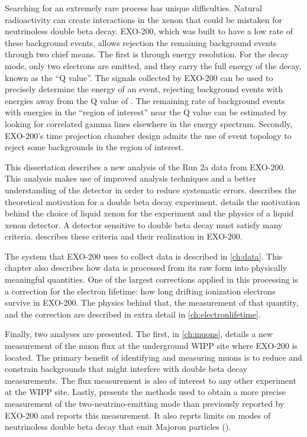 \documentclass[herrin-thesis.tex]{subfiles}
\begin{document}
Searching for an extremely rare process has unique difficulties. Natural radioactivity can create interactions in the xenon that could be mistaken for neutrinoless double beta decay. EXO-200, which was built to have a low rate of these background events, allows rejection the remaining background events through two chief means. The first is through energy resolution. For the \zeronu{} decay mode, only two electrons are emitted, and they carry the full energy of the decay, known as the ``Q value''. The signals collected by EXO-200 can be used to precisely determine the energy of an event, rejecting background events with energies away from the Q value of . The remaining rate of background events with energies in the ``region of interest'' near the Q value can be estimated by looking for correlated gamma lines elsewhere in the energy spectrum. Secondly, EXO-200's time projection chamber design admits the use of event topology to reject some backgrounds in the region of interest.

This dissertation describes a new analysis of the Run 2a data from EXO-200. This analysis makes use of improved analysis techniques and a better understanding of the detector in order to reduce systematic errors.  describes the theoretical motivation for a double beta decay experiment.  details the motivation behind the choice of liquid xenon for the experiment and the physics of a liquid xenon detector. A detector sensitive to double beta decay must satisfy many criteria.  describes these criteria and their realization in EXO-200.

The system that EXO-200 uses to collect data is described in \cref{ch:data}. This chapter also describes how data is processed from its raw form into physically meaningful quantities. One of the largest corrections applied in this processing is a correction for the electron lifetime: how long drifting ionization electrons survive in EXO-200. The physics behind that, the measurement of that quantity, and the correction are described in extra detail in \cref{ch:electronlifetime}.

Finally, two analyses are presented. The first, in \cref{ch:muons}, details a new measurement of the muon flux at the underground WIPP site where EXO-200 is located. The primary benefit of identifying and measuring muons is to reduce and constrain backgrounds that might interfere with double beta decay measurements. The flux measurement is also of interest to any other experiment at the WIPP site. Lastly,  presents the methods used to obtain a more precise measurement of the two-neutrino-emitting mode than previously reported by EXO-200 and reports this measurement. It also reprts limits on modes of neutrinoless double beta decay that emit Majoron particles (\zeronuXpX{}).
\end{document}

